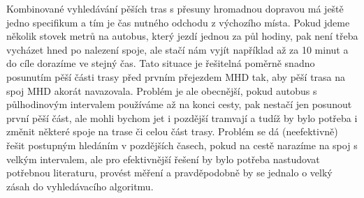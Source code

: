Kombinované vyhledávání pěších tras s přesuny hromadnou dopravou má ještě jedno
specifikum a tím je čas nutného odchodu z výchozího místa. Pokud jdeme několik
stovek metrů na autobus, který jezdí jednou za půl hodiny, pak není třeba
vycházet hned po nalezení spoje, ale stačí nám vyjít například až za 10 minut a
do cíle dorazíme ve stejný čas. Tato situace je řešitelná poměrně snadno
posunutím pěší části trasy před prvním přejezdem MHD tak, aby pěší trasa na spoj
MHD akorát navazovala. Problém je ale obecnější, pokud autobus s půlhodinovým
intervalem používáme až na konci cesty, pak nestačí jen posunout první pěší
část, ale mohli bychom jet i pozdější tramvají a tudíž by bylo potřeba i změnit
některé spoje na trase či celou část trasy. Problém se dá (neefektivně) řešit
postupným hledáním v pozdějších časech, pokud na cestě narazíme na spoj s
velkým intervalem, ale pro efektivnější řešení by bylo potřeba nastudovat
potřebnou literaturu, provést měření a pravděpodobně by se jednalo o velký zásah
do vyhledávacího algoritmu.
